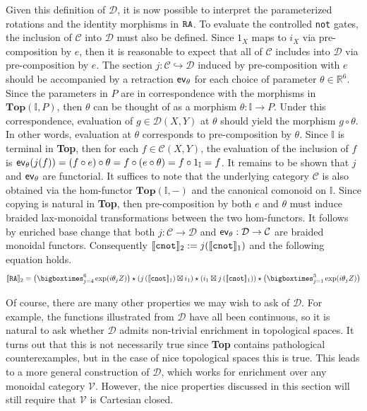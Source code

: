 Given this definition of $\mathcal{D}$, it is now possible to interpret the parameterized rotations and the identity morphisms in $\texttt{RA}$.
To evaluate the controlled \texttt{not} gates, the inclusion of $\mathcal{C}$ into $\mathcal{D}$ must also be defined.
Since $1_X$ maps to $i_X$ via pre-composition by $e$, then it is reasonable to expect that all of $\mathcal{C}$ includes into $\mathcal{D}$ via pre-composition by $e$.
The section $j: \mathcal{C} \hookrightarrow \mathcal{D}$ induced by pre-composition with $e$ should be accompanied by a retraction $\mathsf{ev}_\theta$ for each choice of parameter $\theta \in \mathbb{R}^6$.
Since the parameters in $P$ are in correspondence with the morphisms in $\textbf{Top}( \mathbb{I}, P )$, then $\theta$ can be thought of as a morphism $\theta: \mathbb{I} \to P$.
Under this correspondence, evaluation of $g \in \mathcal{D}( X, Y )$ at $\theta$ should yield the morphism $g \circ \theta$.
In other words, evaluation at $\theta$ corresponds to pre-composition by $\theta$.
Since $\mathbb{I}$ is terminal in \textbf{Top}, then for each $f \in \mathcal{C}( X, Y )$, the evaluation of the inclusion of $f$ is $\mathsf{ev}_\theta( j( f ) ) = ( f \circ e ) \circ \theta = f \circ ( e \circ \theta ) = f \circ 1_{\mathbb{I}} = f$.
It remains to be shown that $j$ and $\mathsf{ev}_\theta$ are functorial.
It suffices to note that the underlying category $\mathcal{C}$ is also obtained via the hom-functor $\mathbf{Top}( \mathbb{I}, - )$ and the canonical comonoid on $\mathbb{I}$.
Since copying is natural in \textbf{Top}, then pre-composition by both $e$ and $\theta$ must induce braided lax-monoidal transformations between the two hom-functors.
It follows by enriched base change that both $j: \mathcal{C} \to \mathcal{D}$ and $\mathsf{ev}_\theta: \mathcal{D} \to \mathcal{C}$ are braided monoidal functors.
Consequently $\llbracket\texttt{cnot}\rrbracket_2 := j( \llbracket\texttt{cnot}\rrbracket_1 )$ and the following equation holds.
\begin{equation*}
    \sem{\RealAmp}_2
    =
    \left( \bigboxtimes_{j=4}^6 \exp( i \theta_j Z ) \right)
    \star
    \left( j\left( \sem{\texttt{cnot}}_1  \right) \boxtimes i_1 \right)
    \star
    \left( i_1 \boxtimes j\left( \sem{\texttt{cnot}}_1 \right) \right)
    \star
    \left( \bigboxtimes_{j=1}^3 \exp( i \theta_j Z ) \right)
\end{equation*}

Of course, there are many other properties we may wish to ask of $\mathcal{D}$.
For example, the functions illustrated from $\mathcal{D}$ have all been continuous, so it is natural to ask whether $\mathcal{D}$ admits non-trivial enrichment in topological spaces.
It turns out that this is not necessarily true since \textbf{Top} contains pathological counterexamples, but in the case of nice topological spaces this is true.
This leads to a more general construction of $\mathcal{D}$, which works for enrichment over any monoidal category $\mathcal{V}$.
However, the nice properties discussed in this section will still require that $\mathcal{V}$ is Cartesian closed.
